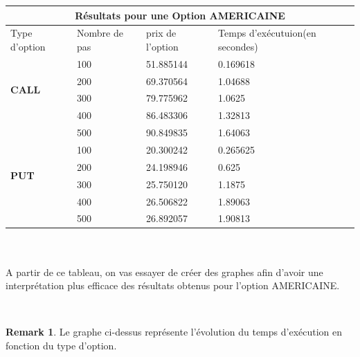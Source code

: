 \documentclass[12pt]{article}
\theoremstyle{definition}
\theoremstyle{definition}
\newtheorem*{remark}{Remark}
\begin{document}
\begin{tabular}{|l|l|l|l|}
  \hline
  \multicolumn{4}{|c|}{Résultats  pour une \textbf{Option AMERICAINE} } \\
  \hline
  Type d'option & Nombre de pas & prix de l'option & Temps d'exécutuion(en secondes)\\ \hline
  \multirow{4}{*}{\textbf{CALL}} & 100 & 51.885144 & 0.169618 \\
    & 200 & 69.370564 & 1.04688 \\
    & 300 & 79.775962 & 1.0625 \\
    & 400 & 86.483306 & 1.32813 \\ 
    & 500 & 90.849835 & 1.64063 \\ \hline
  \multirow{4}{*}{\textbf{PUT}} & 100 & 20.300242 & 0.265625 \\
    & 200 & 24.198946 & 0.625 \\
    & 300 & 25.750120 & 1.1875 \\
    & 400 & 26.506822 & 1.89063 \\
    & 500 & 26.892057 & 1.90813 \\ \hline
\end{tabular} \\ \\

A partir de ce tableau, on vas essayer de créer des graphes afin d'avoir une interprétation plus efficace des résultats obtenus pour l'option AMERICAINE. \newline

 \\
\begin{remark}
Le graphe ci-dessus représente l'évolution du temps d'exécution en fonction du type d'option.
\end{remark}
\end{document}
